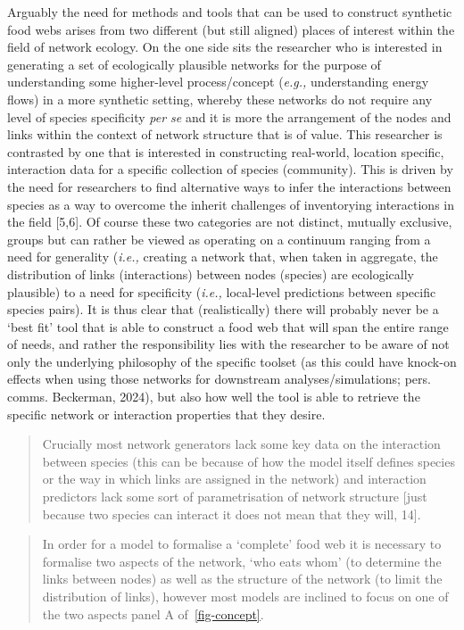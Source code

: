 \documentclass[
]{article}
\begin{document}
Arguably the need for methods and tools that can be used to construct
synthetic food webs arises from two different (but still aligned) places
of interest within the field of network ecology. On the one side sits
the researcher who is interested in generating a set of ecologically
plausible networks for the purpose of understanding some higher-level
process/concept (\emph{e.g.,} understanding energy flows) in a more
synthetic setting, whereby these networks do not require any level of
species specificity \emph{per se} and it is more the arrangement of the
nodes and links within the context of network structure that is of
value. This researcher is contrasted by one that is interested in
constructing real-world, location specific, interaction data for a
specific collection of species (community). This is driven by the need
for researchers to find alternative ways to infer the interactions
between species as a way to overcome the inherit challenges of
inventorying interactions in the field {[}5,6{]}. Of course these two
categories are not distinct, mutually exclusive, groups but can rather
be viewed as operating on a continuum ranging from a need for generality
(\emph{i.e.,} creating a network that, when taken in aggregate, the
distribution of links (interactions) between nodes (species) are
ecologically plausible) to a need for specificity (\emph{i.e.,}
local-level predictions between specific species pairs). It is thus
clear that (realistically) there will probably never be a `best fit'
tool that is able to construct a food web that will span the entire
range of needs, and rather the responsibility lies with the researcher
to be aware of not only the underlying philosophy of the specific
toolset (as this could have knock-on effects when using those networks
for downstream analyses/simulations; pers. comms. Beckerman, 2024), but
also how well the tool is able to retrieve the specific network or
interaction properties that they desire.

\begin{quote}
Crucially most network generators lack some key data on the interaction
between species (this can be because of how the model itself defines
species or the way in which links are assigned in the network) and
interaction predictors lack some sort of parametrisation of network
structure {[}just because two species can interact it does not mean that
they will, 14{]}.
\end{quote}

\begin{quote}
In order for a model to formalise a `complete' food web it is necessary
to formalise two aspects of the network, `who eats whom' (to determine
the links between nodes) as well as the structure of the network (to
limit the distribution of links), however most models are inclined to
focus on one of the two aspects panel A of~\ref{fig-concept}.
\end{quote}
\end{document}
